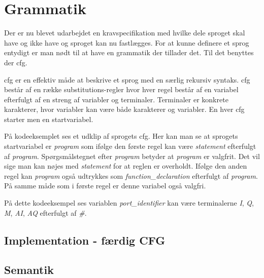 \section{Grammatik}\label{sec:Gramatik}

Der er nu blevet udarbejdet en kravspecifikation med hvilke dele sproget skal have og ikke have og sproget kan nu fastlægges. For at kunne definere et sprog entydigt er man nødt til at have en grammatik der tillader det. Til det benyttes der \gls{cfg}.

\gls{cfg} er en effektiv måde at beskrive et sprog med en særlig rekursiv syntaks. \gls{cfg} består af en række substitutions-regler hvor hver regel består af en variabel efterfulgt af en streng af variabler og terminaler. Terminaler er konkrete karakterer, hvor variabler kan være både karakterer og variabler. En hver \gls{cfg} starter men en startvariabel.

På kodeeksemplet ses et udklip af sprogets \gls{cfg}. Her kan man se at sprogets startvariabel er \textit{program} som ifølge den første regel kan være \textit{statement} efterfulgt af \textit{program}. Spørgsmålstegnet efter \textit{program} betyder at \textit{program} er valgfrit. Det vil sige man kan nøjes med \textit{statement} for at reglen er overholdt. Ifølge den anden regel kan \textit{program} også udtrykkes som \textit{function\_declaration} efterfulgt af \textit{program}. På samme måde som i første regel er denne variabel også valgfri.


\noindent På dette kodeeksempel ses variablen \textit{port\_identifier} kan være terminalerne \textit{I}, \textit{Q}, \textit{M}, \textit{AI}, \textit{AQ} efterfulgt af \textit{\#}.

\subsection{Implementation - færdig CFG}

\subsection{Semantik}
